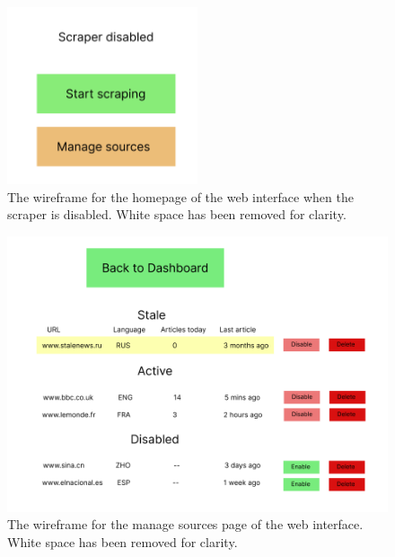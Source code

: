 \documentclass{l4proj}
\begin{document}
\begin{appendices}
 \begin{figure}[h]
\centering
\includegraphics[width=0.5\textwidth]{images/wireframe-home-2.png}
\caption{The wireframe for the homepage of the web interface when the scraper is disabled. White space has been removed for clarity.}
\label{fig:interface-wireframe}
\end{figure}

 \begin{figure}[h]
\centering
\includegraphics[width=\textwidth]{images/interface-wireframe-sources.png}
\caption{The wireframe for the manage sources page of the web interface. White space has been removed for clarity.}
\label{fig:interface-wireframe}
\end{figure}


\end{appendices}
\end{document}
